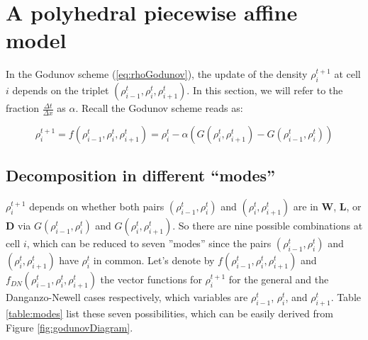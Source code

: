 \section{A polyhedral piecewise affine model}

In the Godunov scheme (\ref{eq:rhoGodunov}), the update of the density $\rho^{t+1}_{i}$ at cell $i$ depends on the triplet $(\rho^{t}_{i-1}, \rho^{t}_{i}, \rho^{t}_{i+1})$. In this section, we will refer to the fraction $\frac{\Delta t}{\Delta x}$ as $\alpha$. Recall the Godunov scheme reads as:

\begin{equation} \label{eq:rhoGodunov2}
\rho^{t+1}_{i} = f(\rho^{t}_{i-1},\rho^{t}_{i},\rho^{t}_{i+1}) = \rho^{t}_{i} - \alpha\left(G(\rho^{t}_{i},\rho^{t}_{i+1})-G(\rho^{t}_{i-1},\rho^{t}_{i})\right)
\end{equation}

\subsection{Decomposition in different ``modes''}\label{sec:decompositionModes}

$\rho^{t+1}_{i}$ depends on whether both pairs $(\rho^{t}_{i-1}, \rho^{t}_{i})$ and $(\rho^{t}_{i}, \rho^{t}_{i+1})$ are in \textbf{W}, \textbf{L}, or \textbf{D} via $G(\rho^{t}_{i-1},\rho^{t}_{i})$ and $G(\rho^{t}_{i},\rho^{t}_{i+1})$. So there are nine possible combinations at cell $i$, which can be reduced to seven ''modes'' since the pairs $(\rho^{t}_{i-1}, \rho^{t}_{i})$ and $(\rho^{t}_{i}, \rho^{t}_{i+1})$ have $\rho^{t}_{i}$ in common. Let's denote by $f(\rho^{t}_{i-1},\rho^{t}_{i},\rho^{t}_{i+1})$ and $f_{DN}(\rho^{t}_{i-1},\rho^{t}_{i},\rho^{t}_{i+1})$ the vector functions for $\rho^{t+1}_{i}$ for the general and the Danganzo-Newell cases respectively, which variables are $\rho^{t}_{i-1}$, $\rho^{t}_{i}$, and $\rho^{t}_{i+1}$. Table \ref{table:modes} list these seven possibilities, which can be easily derived from Figure \ref{fig:godunovDiagram}.

